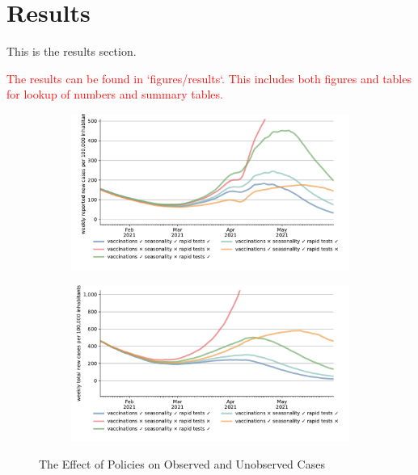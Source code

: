 \section{Results}
\label{sec:results}

This is the results section.

\textcolor{red}{The results can be found in `figures/results`. This includes both figures
and tables for lookup of numbers and summary tables.}


\begin{figure}[ht]
\centering
\begin{subfigure}{.6\textwidth}
  \includegraphics[width=0.9 \textwidth]{../figures/results/figures/scenario_comparisons/one_off_and_combined/full_new_known_case_cropped}
\end{subfigure}%
\begin{subfigure}{.6\textwidth}
  \includegraphics[width=0.9 \textwidth]{../figures/results/figures/scenario_comparisons/one_off_and_combined/full_newly_infected_cropped}
\end{subfigure}
\caption{The Effect of Policies on Observed and Unobserved Cases}
\label{fig:explain_decline}
\figurenotes{\textcolor{red}{\ldots}}
\end{figure}





